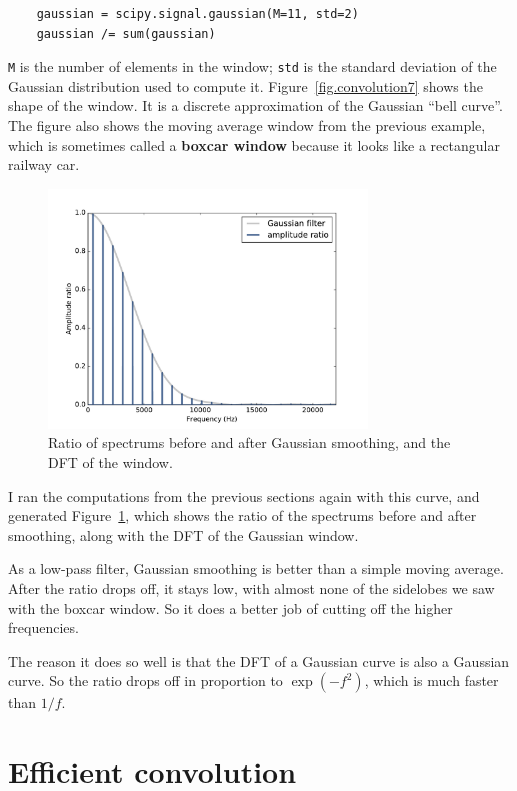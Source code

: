 \documentclass[12pt]{book}
\begin{document}
\begin{verbatim}
    gaussian = scipy.signal.gaussian(M=11, std=2)
    gaussian /= sum(gaussian)
\end{verbatim}

{\tt M} is the number of elements in the window; {\tt std}
is the standard deviation of the Gaussian distribution used to
compute it.  Figure~\ref{fig.convolution7} shows the shape
of the window.  It is a discrete approximation of the Gaussian
``bell curve''.  The figure also shows the moving average window
from the previous example, which is sometimes called a
{\bf boxcar window} because it looks like a rectangular railway car.

\begin{figure}
\centerline{\includegraphics[height=2.5in]{figs/convolution8.pdf}}
\caption{Ratio of spectrums before and after Gaussian smoothing, and
  the DFT of the window.}
\label{fig.convolution8}
\end{figure}

I ran the computations from the previous sections again
with this curve, and generated Figure~\ref{fig.convolution8},
which shows the ratio of the spectrums before and after
smoothing, along with the DFT of the Gaussian window. 

As a low-pass filter, Gaussian smoothing is better than a simple
moving average.  After the ratio drops off, it stays low, with almost
none of the sidelobes we saw with the boxcar window.  So it does a
better job of cutting off the higher frequencies.

The reason it does so well is that the DFT of a Gaussian curve is also a
Gaussian curve.  So the ratio drops off in proportion to $\exp(-f^2)$,
which is much faster than $1/f$.


\section{Efficient convolution}
\label{effconv}
\end{document}

